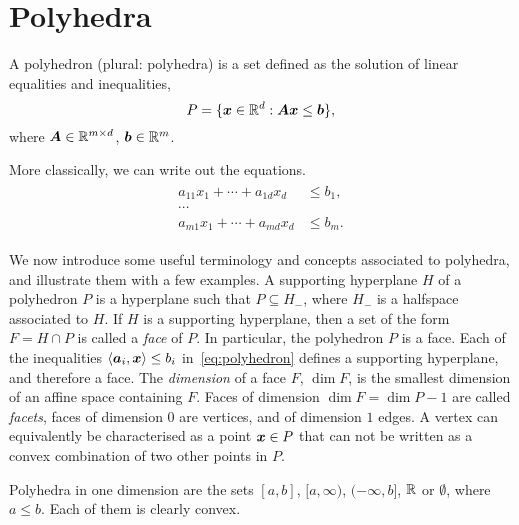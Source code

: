 \section{Polyhedra}

\begin{definition}
 A polyhedron (plural: polyhedra) is a set defined as the solution of linear equalities and inequalities,
 \begin{equation}\label{eq:polyhedron}
  P = \{\bm{x}\in \mathbb{R}^d \mathrel{\mathop{:}} \bm{A}\bm{x}\leq \bm{b}\},
 \end{equation}
where $\bm{A}\in \mathbb{R}^{m\times d}$, $\bm{b}\in \mathbb{R}^m$. 
\end{definition}

More classically, we can write out the equations.
\begin{align}\label{eq:eq}
\begin{split}
 a_{11}x_1+\cdots +a_{1d}x_d &\leq b_1,\\
 \cdots& \\
 a_{m1}x_1+\cdots +a_{md}x_d & \leq b_m.
 \end{split}
\end{align}

We now introduce some useful terminology and concepts associated to polyhedra, and illustrate them with a few examples.
A supporting hyperplane $H$ of a polyhedron $P$ is a hyperplane such that $P\subseteq H_-$, where $H_-$ is a halfspace associated to $H$. If $H$ is a supporting hyperplane, then a set of the form $F=H\cap P$ is called a {\em face} of $P$. In particular, the polyhedron $P$ is a face.
Each of the inequalities $\langle {\bm{a}_i}, {\bm{x}} \rangle\leq b_i$ in~\eqref{eq:polyhedron} defines a supporting hyperplane, and therefore a face. The {\em dimension} of a face $F$,
$\dim F$, is the smallest dimension of an affine space containing $F$. Faces of dimension $\dim F=\dim P-1$ are called {\em facets}, faces of dimension $0$ are vertices, and of dimension $1$ edges. A vertex can equivalently be characterised as a point $\bm{x}\in P$ that can not be written as a convex combination of two other points in $P$.

\begin{example}
 Polyhedra in one dimension are the sets $[a,b]$, $[a,\infty)$, $(-\infty,b]$, $\mathbb{R}$ or $\emptyset$, where $a\leq b$. Each of them is clearly convex.
\end{example}

